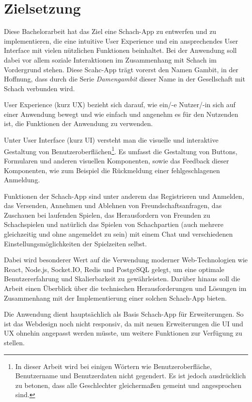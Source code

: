     \section{Zielsetzung}
    \label{sec:Zielsetzung}
    Diese Bachelorarbeit hat das Ziel eine Schach-App zu entwerfen und zu implementieren, die eine intuitive User Experience und ein ansprechendes User Interface mit vielen nützlichen Funktionen beinhaltet. Bei der Anwendung soll dabei vor allem soziale Interaktionen im Zusammenhang mit Schach im Vordergrund stehen. Diese Scahc-App trägt vorerst den Namen \glqq Gambit\grqq , in der Hoffnung, dass durch die Serie \textit{Damengambit} dieser Name in der Gesellschaft mit Schach verbunden wird.
    
User Experience (kurz UX) bezieht sich darauf, wie ein/-e Nutzer/-in sich auf einer Anwendung bewegt und wie einfach und angenehm es für den Nutzenden ist, die Funktionen der Anwendung zu verwenden.
    
    Unter User Interface (kurz UI) versteht man die visuelle und interaktive Gestaltung von Benutzeroberflächen\footnote{In dieser Arbeit wird bei einigen Wörtern wie Benutzeroberfläche, Benutzername und Benutzerdaten nicht gegendert. Es ist jedoch ausdrücklich zu betonen, dass alle Geschlechter gleichermaßen gemeint und angesprochen sind.}. Es umfasst die Gestaltung von Buttons, Formularen und anderen visuellen Komponenten, sowie das Feedback dieser Komponenten, wie zum Beispiel die Rückmeldung einer fehlgeschlagenen Anmeldung.\cite{webdesign}
        
        Funktionen der Schach-App sind unter anderem das Registrieren und Anmelden, das Versenden, Annehmen und Ablehnen von Freundschaftsanfragen, das Zuschauen bei laufenden Spielen, das Herausfordern von Freunden zu Schachspielen und natürlich das Spielen von Schachpartien (auch mehrere gleichzeitig und ohne angemeldet zu sein) mit einem Chat und verschiedenen Einstellungsmöglichkeiten der Spielzeiten selbst. 
        
    Dabei wird besonderer Wert auf die Verwendung moderner Web-Technologien wie React, Node.js, Socket.IO, Redis und PostgeSQL gelegt, um eine optimale Benutzererfahrung und Skalierbarkeit zu gewährleisten. Darüber hinaus soll die Arbeit einen Überblick über die technischen Herausforderungen und Lösungen im Zusammenhang mit der Implementierung einer solchen Schach-App bieten.
    
Die Anwendung dient hauptsächlich als Basis Schach-App für Erweiterungen. So ist das Webdesign noch nicht responsiv, da mit neuen Erweiterungen die UI und UX ohnehin angepasst werden müsste, um weitere Funktionen zur Verfügung zu stellen.

